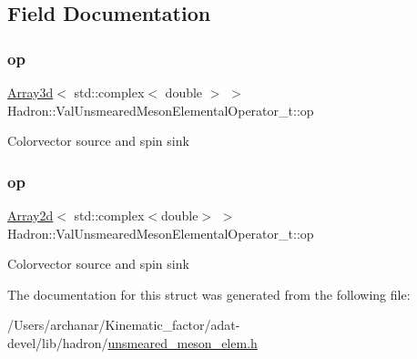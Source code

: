\subsection{Field Documentation}
\mbox{\label{structHadron_1_1ValUnsmearedMesonElementalOperator__t_adddbc042cae219cdbf72683bd441b129}} 
\subsubsection{\texorpdfstring{op}{op}\hspace{0.1cm}{\footnotesize\ttfamily [1/2]}}
{\footnotesize\ttfamily \mbox{\hyperlink{classXMLArray_1_1Array3d}{Array3d}}$<$ std\+::complex$<$ double $>$ $>$ Hadron\+::\+Val\+Unsmeared\+Meson\+Elemental\+Operator\+\_\+t\+::op}

Colorvector source and spin sink \mbox{\label{structHadron_1_1ValUnsmearedMesonElementalOperator__t_a5715d6a6a39520f277256db9ad3bd034}} 
\subsubsection{\texorpdfstring{op}{op}\hspace{0.1cm}{\footnotesize\ttfamily [2/2]}}
{\footnotesize\ttfamily \mbox{\hyperlink{classXMLArray_1_1Array2d}{Array2d}}$<$ std\+::complex$<$double$>$ $>$ Hadron\+::\+Val\+Unsmeared\+Meson\+Elemental\+Operator\+\_\+t\+::op}

Colorvector source and spin sink 

The documentation for this struct was generated from the following file\+:\begin{DoxyCompactItemize}
\item 
/\+Users/archanar/\+Kinematic\+\_\+factor/adat-\/devel/lib/hadron/\mbox{\hyperlink{adat-devel_2lib_2hadron_2unsmeared__meson__elem_8h}{unsmeared\+\_\+meson\+\_\+elem.\+h}}\end{DoxyCompactItemize}
